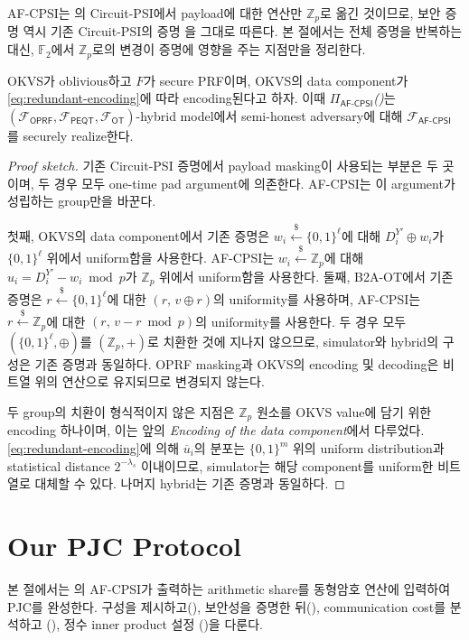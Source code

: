 \documentclass[sigconf,anonymous,review]{acmart}
\newcommand{\Z}{\mathbb{Z}}
\newcommand{\F}{\mathbb{F}}
\newcommand{\func}[1]{\mathcal{F}_{\textsf{#1}}}
\newcommand{\prot}[1]{\Pi_\textsf{#1}}
\begin{document}


AF-CPSI는 의 Circuit-PSI에서 payload에 대한 연산만
$\Z_p$로 옮긴 것이므로, 보안 증명 역시 기존 Circuit-PSI의 증명
\cite{PSTY19,RS21}을 그대로 따른다. 본 절에서는 전체 증명을 반복하는
대신, $\F_2$에서 $\Z_p$로의 변경이 증명에 영향을 주는 지점만을 정리한다.

\begin{theorem}\label{thm:afcpsi}
OKVS가 oblivious하고 $F$가 secure PRF이며, OKVS의 data component가
\eqref{eq:redundant-encoding}에 따라 encoding된다고 하자. 이때
$\prot{AF-CPSI}$\emph{()}는
$(\func{OPRF},\func{PEQT},\func{OT})$-hybrid model에서 semi-honest
adversary에 대해 $\func{AF-CPSI}$를 securely realize한다.
\end{theorem}

\begin{proof}[Proof sketch]
기존 Circuit-PSI 증명에서 payload masking이 사용되는 부분은 두 곳이며, 두
경우 모두 one-time pad argument에 의존한다. AF-CPSI는 이 argument가 성립하는
group만을 바꾼다.

첫째, OKVS의 data component에서 기존 증명은
$w_i\xleftarrow{\$}\{0,1\}^\ell$에 대해 $D_i^{Y'}\oplus w_i$가
$\{0,1\}^\ell$ 위에서 uniform함을 사용한다. AF-CPSI는
$w_i\xleftarrow{\$}\Z_p$에 대해 $u_i=D_i^{Y'}-w_i \bmod p$가 $\Z_p$ 위에서
uniform함을 사용한다. 둘째, B2A-OT에서 기존 증명은
$r\xleftarrow{\$}\{0,1\}^\ell$에 대한 $(r,\,v\oplus r)$의 uniformity를
사용하며, AF-CPSI는 $r\xleftarrow{\$}\Z_p$에 대한 $(r,\,v-r \bmod p)$의
uniformity를 사용한다. 두 경우 모두 $(\{0,1\}^\ell,\oplus)$를 $(\Z_p,+)$로
치환한 것에 지나지 않으므로, simulator와 hybrid의 구성은 기존 증명과 동일하다.
OPRF masking과 OKVS의 encoding 및 decoding은 비트열 위의 연산으로 유지되므로
변경되지 않는다.

두 group의 치환이 형식적이지 않은 지점은 $\Z_p$ 원소를 OKVS value에 담기
위한 encoding 하나이며, 이는 앞의 \emph{Encoding of the data component}에서 다루었다.
\eqref{eq:redundant-encoding}에 의해 $\overline{u}_i$의 분포는 $\{0,1\}^{m}$
위의 uniform distribution과 statistical distance $2^{-\lambda_s}$ 이내이므로,
simulator는 해당 component를 uniform한 비트열로 대체할 수 있다. 나머지
hybrid는 기존 증명과 동일하다.
\end{proof}

\section{Our PJC Protocol}\label{sec:our-pjc}
본 절에서는 의 AF-CPSI가 출력하는 arithmetic share를
동형암호 연산에 입력하여 PJC를 완성한다. 구성을 제시하고(),
보안성을 증명한 뒤(), communication cost를 분석하고
(), 정수 inner product 설정
()을 다룬다.
\end{document}
